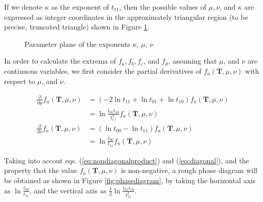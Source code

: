 ﻿\documentclass[a3paper,xelatex,english]{bxjsarticle}
\newcommand\mib[1]{\boldsymbol{#1}}
\begin{document}
If we denote $\kappa$ as the exponent of $t_{11}$, then the possible values of $\mu, \nu$, and $\kappa$ are expressed as integer coordinates in the approximately triangular region (to be precise, truncated triangle) shown in Figure \ref{fig:parameterplane}.
\begin{figure}[htbp]
\centering


\caption{Parameter plane of the exponents $\kappa$, $\mu$, $\nu$}
\label{fig:parameterplane}
\end{figure}

\clearpage

In order to calculate the extrema of $f_{a}, f_{b}, f_{c}$, and $f_{d}$, assuming that $\mu$, and $\nu$ are continuous variables, we first consider the partial derivatives of $f_{a}(\mib{T}, \mu, \nu)$ with respect to $\mu$, and $\nu$.

\begin{align}
	\frac{\partial }{\partial \mu} f_{a}(\mib{T}, \mu, \nu) 
	&= 
	(-2 \ln t_{11} + \ln t_{01} + \ln t_{10}) f_{a}(\mib{T}, \mu, \nu) 
	\nonumber \\
	&= 
	\ln \frac{t_{01} t_{10}}{t_{11}^{2}} 
	f_{a}(\mib{T}, \mu, \nu) 
	\label{eq:nondiagonalproduct}
	\\
	\frac{\partial }{\partial \nu} f_{a}(\mib{T}, \mu, \nu) 
	&= 
	(\ln t_{00} - \ln t_{11}) f_{a}(\mib{T}, \mu, \nu) 
	\nonumber \\
	&= 
	\ln \frac{t_{00}}{t_{11}} 
	f_{a}(\mib{T}, \mu, \nu) 
	\label{eq:diagonal}
\end{align}


Taking into accout eqs. (\ref{eq:nondiagonalproduct}) and (\ref{eq:diagonal}), and the property that the value $f_{a}(\mib{T}, \mu, \nu)$ is non-negative, 
a rough phase diagram will be obtained as shown in Figure \ref{fig:phasediagram}, by taking the horizontal axis as $\ln \frac{t_{00}}{t_{11}}$, and the vertical axis as $\tfrac{1}{2}\ln \frac{t_{01} t_{10}}{t_{11}^{2}}$.
\end{document}
